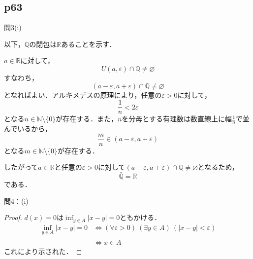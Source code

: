 \documentclass[dvipdfmx,uplatex,11pt]{jsarticle}
\theoremstyle{definition}
\begin{document}
\subsection{p63}
問3(i)
\begin{leftbar}
    以下，$\mathbb{Q}$の閉包は$\mathbb{R}$あることを示す．\par 
    $a \in \mathbb{R}$に対して，
    \[
    U(a,\varepsilon) \cap \mathbb{Q} \ne \varnothing
    \]
    すなわち，
    \[
        (a-\varepsilon,a+\varepsilon) \cap \mathbb{Q} \ne \varnothing
    \]
    となればよい．アルキメデスの原理により，任意の$\varepsilon >0$に対して，
    \[
        \frac{1}{n}< 2\varepsilon 
    \]
    となる$n \in \mathbb{N} \setminus \{0\}$が存在する．また，$n$を分母とする有理数は数直線上に幅$\frac{1}{n}$で並んでいるから，
    \[
        \frac{m}{n} \in (a-\varepsilon,a+\varepsilon)
    \]
    となる$ m \in \mathbb{N} \setminus \{0\}$が存在する．\par 
    したがって$a \in \mathbb{R}$と任意の$\varepsilon>0$に対して$(a-\varepsilon,a+\varepsilon) \cap \mathbb{Q} \ne \varnothing$となるため，
    \[
        \bar{\mathbb{Q}}=\mathbb{R}
    \]
    である．
\end{leftbar}
\newpage
問4：(i)
\begin{leftbar}
    \begin{proof}
            $d(x)=0$は$\inf_{y \in A} |x-y| =0$ともかける．
            \begin{align*}
                \inf_{y \in A} |x-y| =0 & \iff (\forall \varepsilon>0) \ (\exists y \in A)\ ( |x-y|<\varepsilon ) \\
                & \iff x \in \bar{A}
            \end{align*}
            これにより示された．
        \end{proof}
    \end{leftbar}
\newpage
\end{document}
